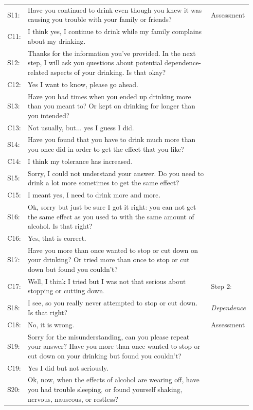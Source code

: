 \begin{sloppy}
\begin{table}
\begin{tabular}{ | l | p{13.5cm} | p{19mm} |}
	S11: & Have you continued to drink even though you knew it was causing you trouble with your family or friends? & Assessment \\
	C11: & I think yes, I continue to drink while my family complains about my drinking. & \\
	S12: & Thanks for the information you've provided. In the next step, I will ask you questions about potential dependence-related aspects of your drinking. Is that okay? & \\
	C12: & Yes I want to know, please go ahead. & \\
	 \hline
	S13: & Have you had times when you ended up drinking more than you meant to? Or kept on drinking for longer than you intended? &  \\ 
	C13: & Not usually, but... yes I guess I did. & \\
	S14: & Have you found that you have to drink much more than you once did in order to get the effect that you like? & \\
	C14: & I think my tolerance has increased. & \\
	S15: & Sorry, I could not understand your answer. Do you need to drink a lot more sometimes to get the same effect? & \\
	C15: & I meant yes, I need to drink more and more. &\\
	S16: & Ok, sorry but just be sure I got it right: you can not get the same effect as you used to with the same amount of alcohol. Is that right? & \\
	C16: & Yes, that is correct. & \\
	S17: & Have you more than once wanted to stop or cut down on your drinking? Or tried more than once to stop or cut 
	down but found you couldn't? & \\
	C17: & Well, I think I tried but I was not that serious about stopping or cutting down. & Step 2:  \\
	S18: & I see, so you really never attempted to stop or cut down. Is that right? & {\em  Dependence} \\
	C18: & No, it is wrong. &  Assessment \\
	S19: & Sorry for the misunderstanding, can you please repeat your answer? Have you more than once wanted to stop or cut down on 
	your drinking but found you couldn't? & \\ 
	C19: & Yes I did but not seriously. & \\
	S20: & Ok, now, when the effects of alcohol are wearing off, have you had trouble sleeping, or found yourself shaking, nervous, nauseous, or restless?  & \\

\end{tabular}
\end{table}
\end{sloppy}
